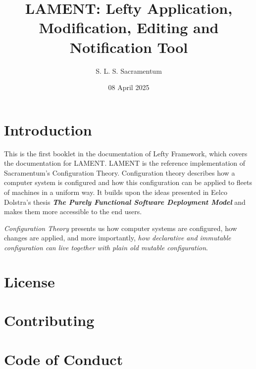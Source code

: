\documentclass{amsbook}
\title{LAMENT: Lefty Application, Modification, Editing and Notification Tool}
\author{S. L. S. Sacramentum}
\date{08 April 2025}
\begin{document}
    \maketitle
    \tableofcontents
    \section{Introduction}
    This is the first booklet in the documentation of Lefty Framework, which covers the documentation for LAMENT.
    LAMENT is the reference implementation of Sacramentum's Configuration Theory. Configuration theory describes
    how a computer system is configured and how this configuration can be applied to fleets of machines in a
    uniform way. It builds upon the ideas presented in Eelco Dolstra's thesis \textbf{\textit{The Purely Functional Software Deployment Model}} and
    makes them more accessible to the end users.

    \textit{Configuration Theory} presents us how computer systems are configured, how changes are applied, and more importantly,
    \textit{how declarative and immutable configuration can live together with plain old mutable configuration}.
    \newpage
    \section{License}
    \newpage
    \section{Contributing}
    
    \newpage
    \section{Code of Conduct}
    
\end{document}
